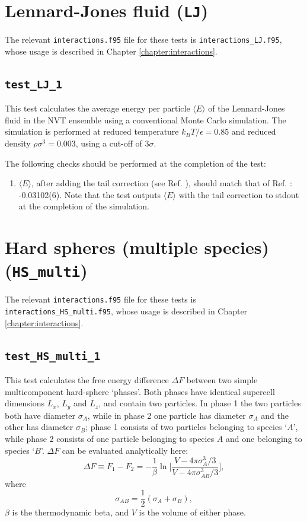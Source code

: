 \documentclass{report}
\begin{document}
\section{Lennard-Jones fluid (\texttt{LJ})}
The relevant \texttt{interactions.f95} file for these tests is \texttt{interactions\_LJ.f95}, whose usage is described in Chapter
\ref{chapter:interactions}.

\subsection{\texttt{test\_LJ\_1}}
This test calculates the average energy per particle $\langle E\rangle$ of the Lennard-Jones fluid in the NVT ensemble using a conventional
Monte Carlo simulation. The simulation is performed at reduced temperature $k_BT/\epsilon=0.85$ and reduced density $\rho \sigma^3=0.003$,
using a cut-off of $3\sigma$.

The following checks should be performed at the completion of the test:
\begin{enumerate}
\item
$\langle E\rangle$, after adding the tail correction (see Ref. \cite{book:Frenkel}), should match that of Ref. \cite{website:NIST}:
 -0.03102(6). Note that the test outputs $\langle E\rangle$ with the tail correction to stdout at the completion of the simulation.
\end{enumerate}


\section{Hard spheres (multiple species) (\texttt{HS\_multi})}
The relevant \texttt{interactions.f95} file for these tests is \texttt{interactions\_HS\_multi.f95}, whose usage is described in Chapter
\ref{chapter:interactions}.

\subsection{\texttt{test\_HS\_multi\_1}}
This test calculates the free energy difference $\Delta F$ between two simple multicomponent hard-sphere `phases'. Both phases have identical supercell
dimensions $L_x$, $L_y$ and $L_z$, and contain two particles. In phase 1 the two particles both have diameter $\sigma_A$, while in phase 2
one particle has diameter $\sigma_A$ and the other has diameter $\sigma_B$; phase 1 consists of two particles belonging to species `$A$', while phase 2
consists of one particle belonging to species $A$ and one belonging to species `$B$'. $\Delta F$ can be evaluated analytically here:
\begin{equation}
\Delta F\equiv F_1-F_2=-\frac{1}{\beta}\ln\Biggl[\frac{V-4\pi\sigma_A^3/3}{V-4\pi\sigma_{AB}^3/3}\Biggr],
\end{equation}
where
\begin{equation}
\sigma_{AB}=\frac{1}{2}(\sigma_A+\sigma_B),
\end{equation}
$\beta$ is the thermodynamic beta, and $V$ is the volume of either phase. 
\end{document}
